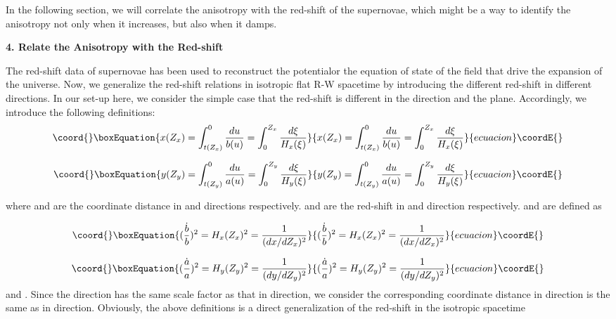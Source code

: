 \documentclass[a4paper,preprint]{revtex4}
\begin{document}
In the following section, we will correlate the anisotropy with
the red-shift of the supernovae, which might be a way to identify
the anisotropy not only when it increases, but also when it damps.

\vspace{0.4cm} \noindent\textbf{4. Relate the Anisotropy with the
Red-shift}
 \vspace{0.4cm}

 The red-shift data of supernovae has been used to reconstruct the
potential\cite{starobinski, turner1, turner2}or the equation of
state\cite{hao} of the field that drive the expansion of the
universe. Now, we generalize the red-shift relations in isotropic
flat R-W spacetime by introducing the different red-shift in
different directions. In our set-up here, we consider the simple
case that the red-shift is different in the \coordHE{} direction and the
\coordHE{} plane. Accordingly, we introduce the following definitions:
\begin{equation}\coord{}\boxEquation{\label{xred}
 x(Z_x)=\int_{t(Z_x)}^0\frac{du}{b(u)}=\int_0^{Z_x}\frac{d\xi}{H_x(\xi)}
}{x(Z_x)=\int_{t(Z_x)}^0\frac{du}{b(u)}=\int_0^{Z_x}\frac{d\xi}{H_x(\xi)}
}{ecuacion}\coordE{}\end{equation}

\begin{equation}\coord{}\boxEquation{\label{yred}
 y(Z_y)=\int_{t(Z_y)}^0\frac{du}{a(u)}=\int_0^{Z_y}\frac{d\xi}{H_y(\xi)}
}{y(Z_y)=\int_{t(Z_y)}^0\frac{du}{a(u)}=\int_0^{Z_y}\frac{d\xi}{H_y(\xi)}
}{ecuacion}\coordE{}\end{equation}

\noindent where \coordHE{} and \coordHE{} are the coordinate distance
in \coordHE{} and \coordHE{} directions respectively. \coordHE{} and \coordHE{} are the
red-shift in \coordHE{} and \coordHE{} direction respectively. \coordHE{} and
\coordHE{} are defined as

\begin{equation}\coord{}\boxEquation{\label{difx}
(\frac{\dot{b}}{b})^2=H_x(Z_x)^2=\frac{1}{(dx/dZ_x)^2}
}{(\frac{\dot{b}}{b})^2=H_x(Z_x)^2=\frac{1}{(dx/dZ_x)^2}
}{ecuacion}\coordE{}\end{equation}

\begin{equation}\coord{}\boxEquation{\label{dify}
(\frac{\dot{a}}{a})^2=H_y(Z_y)^2=\frac{1}{(dy/dZ_y)^2}
}{(\frac{\dot{a}}{a})^2=H_y(Z_y)^2=\frac{1}{(dy/dZ_y)^2}
}{ecuacion}\coordE{}\end{equation}
\coordHE{} and
\coordHE{}. Since the \coordHE{} direction has the
same scale factor as that in \coordHE{} direction, we consider the
corresponding coordinate distance in \coordHE{} direction is the same as
in \coordHE{} direction. Obviously, the above definitions is a direct
generalization of the red-shift in the isotropic spacetime
\end{document}
